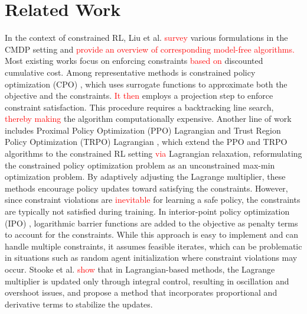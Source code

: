 \section{Related Work}

In the context of constrained RL, Liu et al. \cite{liu2021policy} \textcolor{red}{survey} various formulations in the CMDP setting and \textcolor{red}{provide an overview of corresponding model-free algorithms.}
Most existing works focus on enforcing constraints \textcolor{red}{based on} discounted cumulative cost.
Among representative methods is constrained policy optimization (CPO) \cite{achiam2017constrained}, which uses surrogate functions to approximate both the objective and the constraints.
\textcolor{red}{It then} employs a projection step to enforce constraint satisfaction.
This procedure requires a backtracking line search, \textcolor{red}{thereby making} the algorithm computationally expensive.
Another line of work includes Proximal Policy Optimization (PPO) Lagrangian and Trust Region Policy Optimization (TRPO) Lagrangian \cite{ray2019benchmarking}, which extend the PPO \cite{schulman2017proximal} and TRPO \cite{schulman2015trust} algorithms to the constrained RL setting \textcolor{red}{via} Lagrangian relaxation, reformulating the constrained policy optimization problem as an unconstrained max-min optimization problem.
By adaptively adjusting the Lagrange multiplier, these methods encourage policy updates toward satisfying the constraints.
However, since constraint violations are \textcolor{red}{inevitable} for learning a safe policy, the constraints are typically not satisfied during training.
In interior-point policy optimization (IPO) \cite{liu2020ipo}, logarithmic barrier functions are added to the objective as penalty terms to account for the constraints.
While this approach is easy to implement and can handle multiple constraints, it assumes feasible iterates, which can be problematic in situations such as random agent initialization where constraint violations may occur.
Stooke et al. \cite{stooke2020responsive} \textcolor{red}{show} that in Lagrangian-based methods, the Lagrange multiplier is updated only through integral control, resulting in oscillation and overshoot issues, and propose a method that incorporates proportional and derivative terms to stabilize the updates.